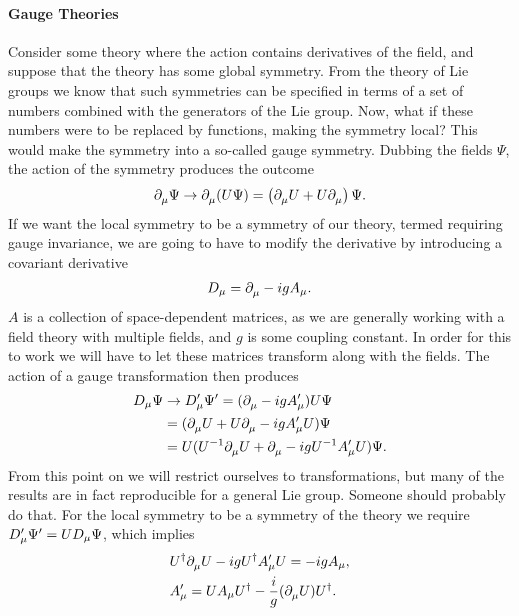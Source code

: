 \paragraph{Gauge Theories}
Consider some theory where the action contains derivatives of the field, and suppose that the theory has some global symmetry. From the theory of Lie groups we know that such symmetries can be specified in terms of a set of numbers combined with the generators of the Lie group. Now, what if these numbers were to be replaced by functions, making the symmetry local? This would make the symmetry into a so-called gauge symmetry. Dubbing the fields $\Psi$, the action of the symmetry produces the outcome
\begin{align*}
	\partial^{}_{\mu}\Psi\to \partial^{}_{\mu}(U\Psi) = \left(\partial^{}_{\mu}U + U\partial^{}_{\mu}\right)\Psi.
\end{align*}
If we want the local symmetry to be a symmetry of our theory, termed requiring gauge invariance, we are going to have to modify the derivative by introducing a covariant derivative
\begin{align*}
	D_{\mu} = \partial^{}_{\mu} - igA_{\mu}.
\end{align*}
$A$ is a collection of space-dependent matrices, as we are generally working with a field theory with multiple fields, and $g$ is some coupling constant. In order for this to work we will have to let these matrices transform along with the fields. The action of a gauge transformation then produces
\begin{align*}
	D_{\mu}\Psi &\to D_{\mu}^{\prime}\Psi^{\prime} = (\partial^{}_{\mu} - igA_{\mu}^{\prime})U\Psi \\
                &= (\partial^{}_{\mu}U + U\partial^{}_{\mu} - igA_{\mu}^{\prime} U)\Psi \\
	            &= U(U^{-1}\partial^{}_{\mu}U + \partial^{}_{\mu} - igU^{-1}A_{\mu}^{\prime} U)\Psi.
\end{align*}
From this point on we will restrict ourselves to  transformations, but many of the results are in fact reproducible for a general Lie group. Someone should probably do that. For the local symmetry to be a symmetry of the theory we require $D_{\mu}^{\prime}\Psi^{\prime} = UD_{\mu}\Psi$, which implies
\begin{align*}
	&U^{\dagger}\partial^{}_{\mu}U - igU^{\dagger} A_{\mu}^{\prime} U = -igA_{\mu}, \\
	&A_{\mu}^{\prime} = UA_{\mu}U^{\dagger} - \frac{i}{g}(\partial^{}_{\mu}U)U^{\dagger}.
\end{align*}

